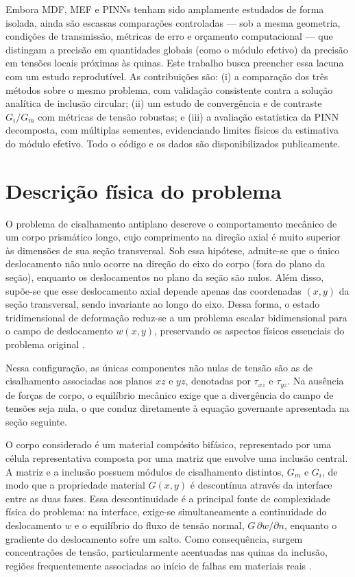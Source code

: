 \documentclass[brazil]{TCAM} %
\begin{document}
Embora MDF, MEF e PINNs tenham sido amplamente estudados de forma isolada, ainda são escassas comparações controladas --- sob a mesma geometria, condições de transmissão, métricas de erro e orçamento computacional --- que distingam a precisão em quantidades globais (como o módulo efetivo) da precisão em tensões locais próximas às quinas. Este trabalho busca preencher essa lacuna com um estudo reprodutível. As contribuições são: (i) a comparação dos três métodos sobre o mesmo problema, com validação consistente contra a solução analítica de inclusão circular; (ii) um estudo de convergência e de contraste $G_i/G_m$ com métricas de tensão robustas; e (iii) a avaliação estatística da PINN decomposta, com múltiplas sementes, evidenciando limites físicos da estimativa do módulo efetivo. Todo o código e os dados são disponibilizados publicamente.


\section{Descrição física do problema}

O problema de cisalhamento antiplano descreve o comportamento mecânico de um corpo prismático longo, cujo comprimento na direção axial é muito superior às dimensões de sua seção transversal. Sob essa hipótese, admite-se que o único deslocamento não nulo ocorre na direção do eixo do corpo (fora do plano da seção), enquanto os deslocamentos no plano da seção são nulos. Além disso, supõe-se que esse deslocamento axial depende apenas das coordenadas $(x,y)$ da seção transversal, sendo invariante ao longo do eixo. Dessa forma, o estado tridimensional de deformação reduz-se a um problema escalar bidimensional para o campo de deslocamento $w(x,y)$, preservando os aspectos físicos essenciais do problema original \cite{lin2021simulation}.

Nessa configuração, as únicas componentes não nulas de tensão são as de cisalhamento associadas aos planos $xz$ e $yz$, denotadas por $\tau_{xz}$ e $\tau_{yz}$. Na ausência de forças de corpo, o equilíbrio mecânico exige que a divergência do campo de tensões seja nula, o que conduz diretamente à equação governante apresentada na seção seguinte.

O corpo considerado é um material compósito bifásico, representado por uma célula representativa composta por uma matriz que envolve uma inclusão central. A matriz e a inclusão possuem módulos de cisalhamento distintos, $G_m$ e $G_i$, de modo que a propriedade material $G(x,y)$ é descontínua através da interface entre as duas fases. Essa descontinuidade é a principal fonte de complexidade física do problema: na interface, exige-se simultaneamente a continuidade do deslocamento $w$ e o equilíbrio do fluxo de tensão normal, $G\,\partial w/\partial n$, enquanto o gradiente do deslocamento sofre um salto. Como consequência, surgem concentrações de tensão, particularmente acentuadas nas quinas da inclusão, regiões frequentemente associadas ao início de falhas em materiais reais \cite{kohno1995singularities}.
\end{document}
